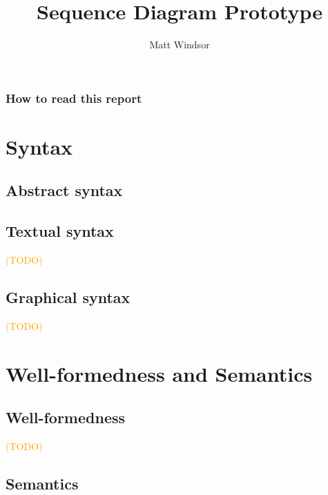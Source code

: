 \documentclass[a4paper]{memoir}
\title{\langname{} Sequence Diagram Prototype}
\author{Matt Windsor}
\newcommand{\todo}[1]{\textcolor{orange}{(#1)}}
\theoremstyle{definition}
\begin{document}
\pagestyle{sruled}

\maketitle

\tableofcontents{}


\section*{How to read this report}


\part{Syntax}

\chapter{Abstract syntax}


\chapter{Textual syntax}
\todo{TODO}

\chapter{Graphical syntax}
\todo{TODO}

\part{Well-formedness and Semantics}

\chapter{Well-formedness}
\todo{TODO}

\chapter{Semantics}

\end{document}

